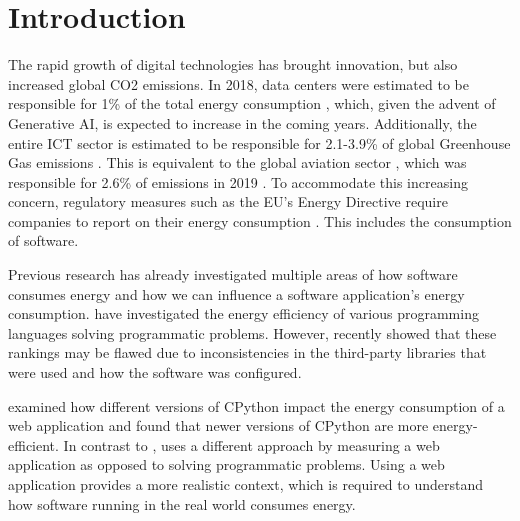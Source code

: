 \documentclass[../main.tex]{subfiles}
\begin{document}

\section{Introduction}
The rapid growth of digital technologies has brought innovation, but also increased global CO2 emissions. In 2018, data centers were estimated to be responsible for 1\% of the total energy consumption \cite{Masanet_Shehabi_Lei_Smith_Koomey_2020}, which, given the advent of Generative AI, is expected to increase in the coming years. Additionally, the entire ICT sector is estimated to be responsible for 2.1-3.9\% of global Greenhouse Gas emissions \cite{freitag2021climate}. This is equivalent to the global aviation sector \cite{lee2010aviation}, which was responsible for 2.6\% of emissions in 2019 \cite{planes2021simulation}. To accommodate this increasing concern, regulatory measures such as the EU's Energy Directive require companies to report on their energy consumption \cite{eu-environmental-efficiency-directive, eu-environmental-impact-reporting-article}. This includes the consumption of software.

Previous research has already investigated multiple areas of how software consumes energy and how we can influence a software application's energy consumption. \textcite{pereira2017energy, Pereira_Couto_Ribeiro_Rua_Cunha_Fernandes_Saraiva_2021, Couto_Pereira_Ribeiro_Rua_Saraiva_2017, Gordillo_Calero_Moraga_García_Fernandes_Abreu_Saraiva_2024} have investigated the energy efficiency of various programming languages solving programmatic problems. However, \textcite{Kempen_Kwon_Nguyen_Berger_2024} recently showed that these rankings may be flawed due to inconsistencies in the third-party libraries that were used and how the software was configured.

\textcite{Pfeiffer_2024} examined how different versions of CPython impact the energy consumption of a web application and found that newer versions of CPython are more energy-efficient.  In contrast to \textcite{pereira2017energy, Pereira_Couto_Ribeiro_Rua_Cunha_Fernandes_Saraiva_2021, Couto_Pereira_Ribeiro_Rua_Saraiva_2017, Gordillo_Calero_Moraga_García_Fernandes_Abreu_Saraiva_2024},  \textcite{Pfeiffer_2024} uses a different approach by measuring a web application as opposed to solving programmatic problems. Using a web application provides a more realistic context, which is required to understand how software running in the real world consumes energy.
\end{document}
